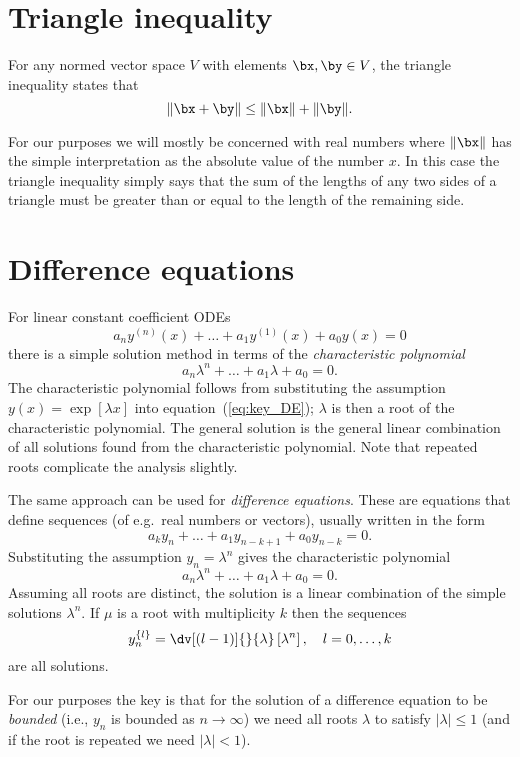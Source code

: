 \section{Triangle inequality}

For any normed vector space $V$ with elements $\bx, \by \in V$, the
triangle inequality states that
%
\begin{equation}
  \label{eq:key_triangle}
  \| \bx + \by \| \leq \| \bx \| + \| \by \|.
\end{equation}

For our purposes we will mostly be concerned with real numbers where
$\| \bx \|$ has the simple interpretation as the absolute value of the
number $x$. In this case the triangle inequality simply says that the
sum of the lengths of any two sides of a triangle must be greater than
or equal to the length of the remaining side.

\section{Difference equations}

For linear constant coefficient ODEs
%
\begin{equation}
  \label{eq:key_DE}
  a_n y^{(n)}(x) + \dots + a_1 y^{(1)}(x) + a_0 y(x) = 0
\end{equation}
%
there is a simple solution method in terms of the \emph{characteristic
polynomial}
%
\begin{equation}
  \label{eq:key_DE2}
  a_n \lambda^n + \dots + a_1 \lambda + a_0 = 0.
\end{equation}
%
The characteristic polynomial follows from substituting the assumption
$y(x) = \exp[\lambda x]$ into equation~(\ref{eq:key_DE}); $\lambda$ is
then a root of the characteristic polynomial. The general solution is
the general linear combination of all solutions found from the
characteristic polynomial. Note that repeated roots complicate the
analysis slightly.

The same approach can be used for \emph{difference equations}. These
are equations that define sequences (of e.g.\ real numbers or
vectors), usually written in the form
%
\begin{equation}
  \label{eq:key_DE3}
  a_k y_n + \dots + a_1 y_{n-k+1} + a_0 y_{n-k} = 0.
\end{equation}
%
Substituting the assumption $y_n = \lambda^n$ gives the characteristic
polynomial
%
\begin{equation}
  \label{eq:key_DE4}
  a_n \lambda^n + \dots + a_1 \lambda + a_0 = 0.
\end{equation}
%
Assuming all roots are distinct, the solution is a linear combination
of the simple solutions $\lambda^n$. If $\mu$ is a root with
multiplicity $k$ then the sequences
%
\begin{equation}
  \label{eq:key_DE5}
  y^{\{l\}}_n = \dv[(l-1)]{}{\lambda} \left[
    \lambda^n \right], \quad l = 0, \dots, k
\end{equation}
%
are all solutions.

For our purposes the key is that for the solution of a difference
equation to be \emph{bounded} (i.e., $y_n$ is bounded as $n \rightarrow
\infty$) we need all roots $\lambda$ to satisfy $|\lambda| \le 1$ (and
if the root is repeated we need $|\lambda| < 1$).

